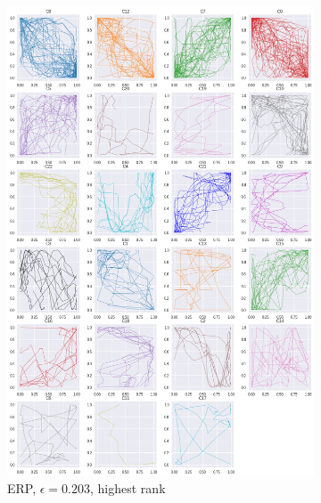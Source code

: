 \begin{figure}[h!]
  \centering
  \hspace{1em}
   \begin{subfigure}[c]{0.4\linewidth}
     \includegraphics[width=\linewidth]{figs/clusters/CLU_H_ALL[ERP;g=0,0].png}
    \caption{ERP, $\epsilon=0.203$, highest rank}
  \end{subfigure}
  \hfill
  \begin{subfigure}[c]{0.4\linewidth}

\end{subfigure}
\end{figure}
